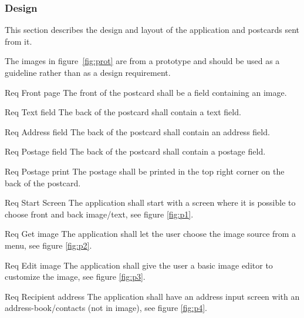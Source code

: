 \documentclass[10pt,a4paper]{article}
\begin{document}
\subsubsection{Design}
This section describes the design and layout of the application and postcards sent from it. 

The images in figure~\ref{fig:prot} are from a prototype and should be used as a guideline rather than as a design requirement.

\begin {description}
	\item [Req \thesubsubsection {.\thedesign} Front page] The front of the postcard shall be a field containing an image.
	\item [Req \thesubsubsection {.\thedesign} Text field] The back of the postcard shall contain a text field.
	\item [Req \thesubsubsection {.\thedesign} Address field] The back of the postcard shall contain an address field.
	\item [Req \thesubsubsection {.\thedesign} Postage field] The back of the postcard shall contain a postage field. 
	\item [Req \thesubsubsection {.\thedesign} Postage print] The postage shall be printed in the top right corner on the back of the postcard. 


	\item [Req \thesubsubsection {.\thedesign} Start Screen] The application shall start with a screen where it is possible to choose front and back image/text, see figure \ref{fig:p1}.
	\item [Req \thesubsubsection {.\thedesign} Get image] The application shall let the user choose the image source from a menu, see figure \ref{fig:p2}.
	\item [Req \thesubsubsection {.\thedesign} Edit image]The application shall give the user a basic image editor to customize the image, see figure \ref{fig:p3}.
	\item [Req \thesubsubsection {.\thedesign} Recipient address] The application shall have an address input screen with an address-book/contacts (not in image), see figure \ref{fig:p4}.
\end{description}
\end{document}
